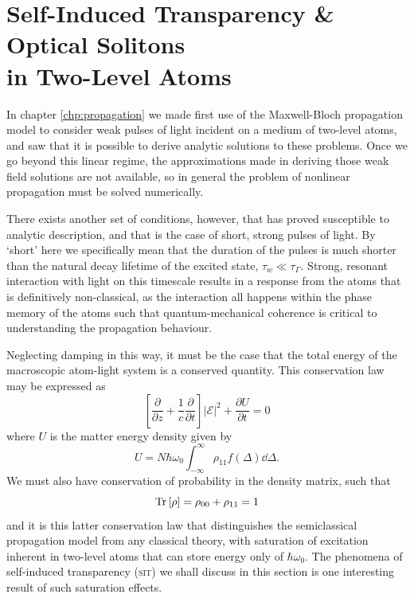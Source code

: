 \section[Self-Induced Transparency \& Optical Solitons]
  {Self-Induced Transparency \& Optical Solitons\\ in Two-Level Atoms}
  \label{sec:sit}


    In chapter \ref{chp:propagation} we made first use of the Maxwell-Bloch
    propagation model to consider weak pulses of light incident on a medium of
    two-level atoms, and saw that it is possible to derive analytic solutions to
    these problems. Once we go beyond this linear regime, the approximations
    made in deriving those weak field solutions are not available, so in general
    the problem of nonlinear propagation must be solved numerically.

    There exists another set of conditions, however, that has proved susceptible
    to analytic description, and that is the case of short, strong pulses of
    light. By `short' here we specifically mean that the duration of the pulses
    is much shorter than the natural decay lifetime of the excited state, \ie
    $\tau_w \ll \tau_\Gamma$. Strong, resonant interaction with light on this
    timescale results in a response from the atoms that is definitively 
    non-classical, as the interaction all happens within the phase memory of the
    atoms such that quantum-mechanical coherence is critical to understanding
    the propagation behaviour.

    Neglecting damping in this way, it must be the case that the total energy of
    the macroscopic atom-light system is a conserved quantity. This conservation
    law may be expressed as\cite{allen1975optical}
    \begin{equation}
      \left[ \frac{\partial}{\partial z} + 
      \frac{1}{c}\frac{\partial}{\partial t} \right]
      \lvert \mathcal{E} \rvert^2 + \frac{\partial U}{\partial t} = 0
    \end{equation}
    where $U$ is the matter energy density given by
    \begin{equation}
      U = N \hbar \omega_0 \int_{-\infty}^{\infty} \rho_{11} f(\Delta)  
      \dd \Delta.
    \end{equation}
    We must also have conservation of probability in the density matrix,
    such that
    \begin{equation}
      \operatorname{Tr}{\left[ \rho \right]} = \rho_{00} + \rho_{11} = 1  
    \end{equation}
    and it is this latter conservation law that distinguishes the semiclassical
    propagation model from any classical theory, with saturation of excitation
    inherent in two-level atoms that can store energy only of $\hbar \omega_0$.
    The phenomena of self-induced transparency (\textsc{sit}) we shall discuss
    in this section is one interesting result of such saturation effects.

